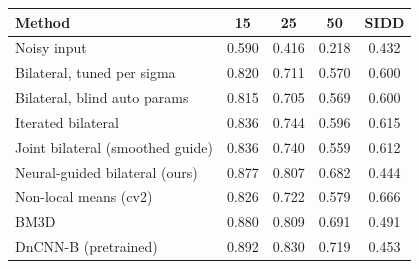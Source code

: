 \begin{tabular}{lcccc}
\toprule
Method & 15 & 25 & 50 & SIDD \\
\midrule
Noisy input & 0.590 & 0.416 & 0.218 & 0.432 \\
Bilateral, tuned per sigma & 0.820 & 0.711 & 0.570 & 0.600 \\
Bilateral, blind auto params & 0.815 & 0.705 & 0.569 & 0.600 \\
Iterated bilateral & 0.836 & 0.744 & 0.596 & 0.615 \\
Joint bilateral (smoothed guide) & 0.836 & 0.740 & 0.559 & 0.612 \\
Neural-guided bilateral (ours) & 0.877 & 0.807 & 0.682 & 0.444 \\
Non-local means (cv2) & 0.826 & 0.722 & 0.579 & 0.666 \\
BM3D & 0.880 & 0.809 & 0.691 & 0.491 \\
DnCNN-B (pretrained) & 0.892 & 0.830 & 0.719 & 0.453 \\
\bottomrule
\end{tabular}
